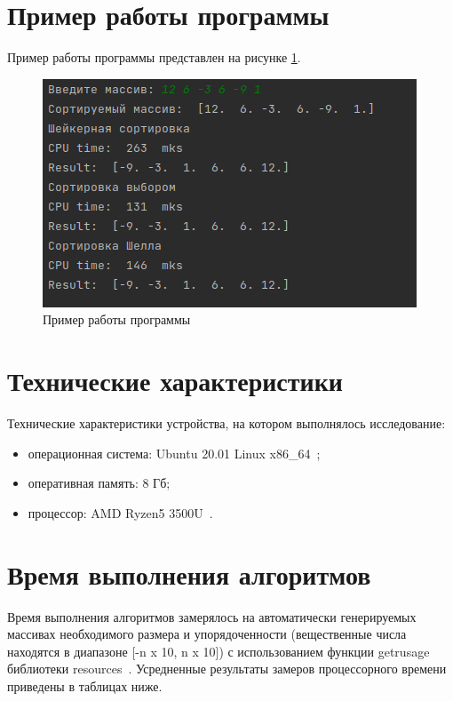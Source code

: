 \documentclass[a4paper,oneside,14pt]{extreport}
\begin{document}
\section{Пример работы программы}
Пример работы программы представлен на рисунке \ref{fig:work_example}.
\captionsetup{singlelinecheck=true}
\begin{figure}[H]
	\centering
	\includegraphics[width=0.7\linewidth]{images/example}
	\caption{Пример работы программы}
	\label{fig:work_example}
\end{figure}

\section{Технические характеристики}
Технические характеристики устройства, на котором выполнялось исследование:
\begin{itemize}
	\item операционная система: Ubuntu 20.01 Linux x86\_64~\cite{ubuntu};
	\item оперативная память: 8 Гб;
	\item процессор: AMD Ryzen5 3500U~\cite{processor}.
\end{itemize}

\section{Время выполнения алгоритмов}
Время выполнения алгоритмов замерялось на автоматически генерируемых массивах необходимого размера и упорядоченности (вещественные числа находятся в диапазоне [-n x 10, n x 10]) с использованием функции getrusage библиотеки resources~\cite{resource}. Усредненные результаты замеров процессорного времени приведены в таблицах ниже.
\end{document}
